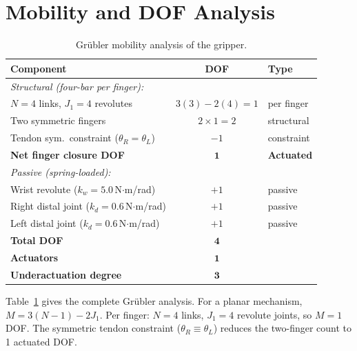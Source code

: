\documentclass[10pt,twocolumn]{article}
\begin{document}
\section{Mobility and DOF Analysis}
\label{sec:dof}

\begin{table}[t]
  \centering
  \caption{Grübler mobility analysis of the gripper.}
  \label{tab:dof}
  \small
  \setlength{\tabcolsep}{4pt}
  \begin{tabular}{p{4.2cm}cp{1.6cm}}
    \toprule
    \textbf{Component} & \textbf{DOF} & \textbf{Type} \\
    \midrule
    \multicolumn{3}{l}{\textit{Structural (four-bar per finger):}} \\
    \quad $N{=}4$ links, $J_1{=}4$ revolutes & $3(3)-2(4)=1$ & per finger \\
    \quad Two symmetric fingers & $2{\times}1 = 2$ & structural \\
    \quad Tendon sym.\ constraint ($\theta_R {=} \theta_L$) & $-1$ & constraint \\
    \midrule
    \textbf{Net finger closure DOF} & $\mathbf{1}$ & \textbf{Actuated} \\
    \midrule
    \multicolumn{3}{l}{\textit{Passive (spring-loaded):}} \\
    \quad Wrist revolute \newline ($k_w=5.0$\,N$\cdot$m/rad) & $+1$ & passive \\
    \quad Right distal joint \newline ($k_d=0.6$\,N$\cdot$m/rad) & $+1$ & passive \\
    \quad Left distal joint \newline ($k_d=0.6$\,N$\cdot$m/rad) & $+1$ & passive \\
    \midrule
    \textbf{Total DOF} & $\mathbf{4}$ & \\
    \textbf{Actuators} & $\mathbf{1}$ & \\
    \textbf{Underactuation degree} & $\mathbf{3}$ & \\
    \bottomrule
  \end{tabular}
\end{table}

Table~\ref{tab:dof} gives the complete Grübler analysis. For a planar mechanism, $M = 3(N-1) - 2J_1$. Per finger: $N=4$ links, $J_1=4$ revolute joints, so $M = 1$\,DOF. The symmetric tendon constraint ($\theta_R \equiv \theta_L$) reduces the two-finger count to 1 actuated DOF.
\end{document}
